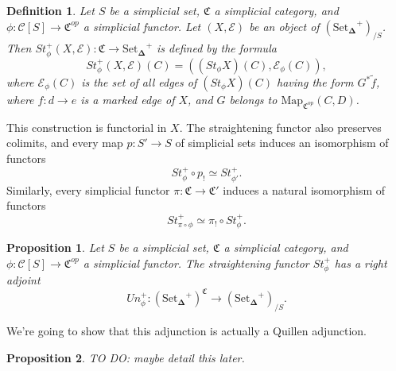 \documentclass[12pt]{amsart}
\newcommand{\8}{\ensuremath{\infty}}
\newcommand{\C}{\ensuremath{\mathfrak{C}}}
\newcommand{\SSet}{\ensuremath{\text{Set}_{\boldsymbol{\Delta}}}}
\newcommand{\Map}{\ensuremath{\text{Map}}}
\newtheorem{definition}{Definition}
\newtheorem{proposition}{Proposition}
\begin{document}
\begin{definition}
  Let $S$ be a simplicial set, $\C$ a simplicial category, and $\phi:\mathscr{C}[S]\rightarrow \C^{op}$ a simplicial functor. Let $(X,\mathcal{E})$ be an object of $(\SSet^+)_{/S}$. Then $St_\phi^+(X,\mathcal{E}):\C\rightarrow \SSet^+$ is defined by the formula \[St_\phi^+(X,\mathcal{E})(C) = ((St_\phi X)(C),\mathcal{E}_\phi(C)),\] where $\mathcal{E}_\phi (C)$ is the set of all edges of $(St_\phi X)(C)$ having the form $G^*\tilde{f}$, where $f:d\rightarrow e$ is a marked edge of $X$, and $G$ belongs to $\Map_{\C^{op}}(C,D)$.
\end{definition}

This construction is functorial in $X$. The straightening functor also preserves colimits, and every map $p:S'\rightarrow S$ of simplicial sets induces an isomorphism of functors \[St_\phi^+\circ p_! \simeq St^+_{\phi'}.\] Similarly, every simplicial functor $\pi:\C\rightarrow \C'$ induces a natural isomorphism of functors \[St^+_{\pi\circ\phi} \simeq \pi_!\circ St^+_\phi.\]

\begin{proposition}
  Let $S$ be a simplicial set, $\C$ a simplicial category, and $\phi:\mathscr{C}[S]\rightarrow \C^{op}$ a simplicial functor. The straightening functor $St^+_\phi$ has a right adjoint \[Un_\phi^+:(\SSet^+)^\C\rightarrow (\SSet^+)_{/S}.\]
\end{proposition}

We're going to show that this adjunction is actually a Quillen adjunction.

\begin{proposition}
  TO DO: maybe detail this later.
\end{proposition}
\end{document}

